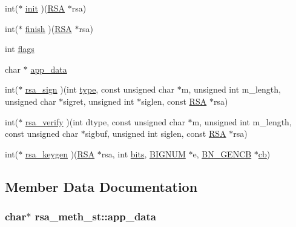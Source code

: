 \begin{DoxyCompactItemize}
\item 
int($\ast$ \hyperlink{structrsa__meth__st_ac8c394e65dbeda15573657fb550c5fe7}{init} )(\hyperlink{ossl__typ_8h_a9ad4496a11f0a9f686bea793cb97f8b5}{R\+SA} $\ast$rsa)
\item 
int($\ast$ \hyperlink{structrsa__meth__st_a12aded957112894c6fd832168a380fbc}{finish} )(\hyperlink{ossl__typ_8h_a9ad4496a11f0a9f686bea793cb97f8b5}{R\+SA} $\ast$rsa)
\item 
int \hyperlink{structrsa__meth__st_ab01ea2742087308a50209ccff23832c7}{flags}
\item 
char $\ast$ \hyperlink{structrsa__meth__st_a3d4a936065797413aad5dc1c7a132f00}{app\+\_\+data}
\item 
int($\ast$ \hyperlink{structrsa__meth__st_a9417375cd40a1ebef8631897593212e5}{rsa\+\_\+sign} )(int \hyperlink{x509_8h_ab512b8f495325c7ea0f5a5a5d3f938eb}{type}, const unsigned char $\ast$m, unsigned int m\+\_\+length, unsigned char $\ast$sigret, unsigned int $\ast$siglen, const \hyperlink{ossl__typ_8h_a9ad4496a11f0a9f686bea793cb97f8b5}{R\+SA} $\ast$rsa)
\item 
int($\ast$ \hyperlink{structrsa__meth__st_a9a5b98e6b902fd0a31b0663b91460627}{rsa\+\_\+verify} )(int dtype, const unsigned char $\ast$m, unsigned int m\+\_\+length, const unsigned char $\ast$sigbuf, unsigned int siglen, const \hyperlink{ossl__typ_8h_a9ad4496a11f0a9f686bea793cb97f8b5}{R\+SA} $\ast$rsa)
\item 
int($\ast$ \hyperlink{structrsa__meth__st_a08d964380b9ca4fd0d7664fe0d14dfd0}{rsa\+\_\+keygen} )(\hyperlink{ossl__typ_8h_a9ad4496a11f0a9f686bea793cb97f8b5}{R\+SA} $\ast$rsa, int \hyperlink{x509v3_8h_ab3c186980893d6836a68407d221ae9c9}{bits}, \hyperlink{ossl__typ_8h_a6fb19728907ec6515e4bfb716bffa141}{B\+I\+G\+N\+UM} $\ast$e, \hyperlink{ossl__typ_8h_ae122a8be18f4fe821e5389381ececa09}{B\+N\+\_\+\+G\+E\+N\+CB} $\ast$\hyperlink{pem_8h_a92c578a1a1d2733de8cf205957a962fc}{cb})
\end{DoxyCompactItemize}


\subsection{Member Data Documentation}
\subsubsection[{\texorpdfstring{app\+\_\+data}{app_data}}]{\setlength{\rightskip}{0pt plus 5cm}char$\ast$ rsa\+\_\+meth\+\_\+st\+::app\+\_\+data}\hypertarget{structrsa__meth__st_a3d4a936065797413aad5dc1c7a132f00}{}\label{structrsa__meth__st_a3d4a936065797413aad5dc1c7a132f00}
